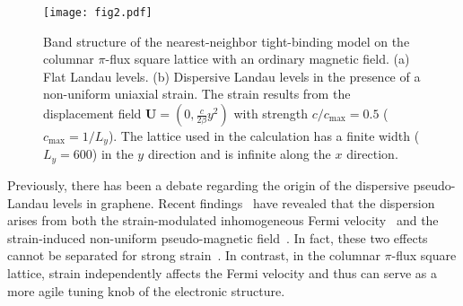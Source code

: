 \documentclass[aps, twocolumn, floatfix, superscriptaddress, prb]{revtex4-1}
\begin{document}
%
\begin{figure}[t]
\centering
\texttt{[image: fig2.pdf]}
\caption{Band structure of the nearest-neighbor tight-binding model on the columnar $\pi$-flux square lattice with an ordinary magnetic field. (a) Flat Landau levels. (b) Dispersive Landau levels in the presence of a non-uniform uniaxial strain. The strain results from the displacement field ${\bm U}=(0,\frac{c}{2\beta}y^2)$ with strength $c/c_{\text{max}}=0.5$ ($c_{\text{max}}=1/L_y$). The lattice used in the calculation has a finite width ($L_y=600$) in the $y$ direction and is infinite along the $x$ direction.
}\label{fig2}
\end{figure}
%

Previously, there has been a debate regarding the origin of the dispersive pseudo-Landau levels in graphene. Recent findings~\cite{liu2022} have revealed that the dispersion arises from both the strain-modulated inhomogeneous Fermi velocity~\cite{lantagne2020, oliva2020} and the strain-induced non-uniform pseudo-magnetic field~\cite{shi2021}. In fact, these two effects cannot be separated for strong strain~\cite{liu2022}. In contrast, in the columnar $\pi$-flux square lattice, strain independently affects the Fermi velocity and thus can serve as a more agile tuning knob of the electronic structure.
\end{document}
